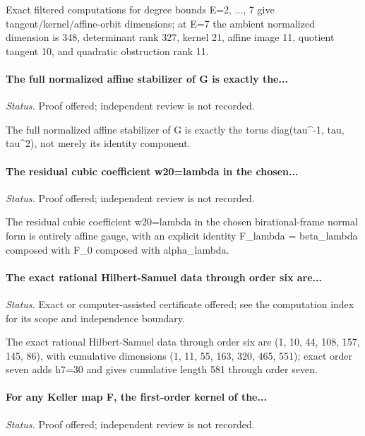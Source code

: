 Exact filtered computations for degree bounds E=2, ..., 7 give tangent/kernel/affine-orbit dimensions; at E=7 the ambient normalized dimension is 348, determinant rank 327, kernel 21, affine image 11, quotient tangent 10, and quadratic obstruction rank 11.

\label{supp-note-03-007}
\paragraph{The full normalized affine stabilizer of G is exactly the...}
\emph{Status.} Proof offered; independent review is not recorded.

The full normalized affine stabilizer of G is exactly the torus diag(tau\textasciicircum{}-1, tau, tau\textasciicircum{}2), not merely its identity component.

\label{supp-note-03-008}
\paragraph{The residual cubic coefficient w20=lambda in the chosen...}
\emph{Status.} Proof offered; independent review is not recorded.

The residual cubic coefficient w20=lambda in the chosen birational-frame normal form is entirely affine gauge, with an explicit identity F\_lambda = beta\_lambda composed with F\_0 composed with alpha\_lambda.

\label{supp-note-03-009}
\paragraph{The exact rational Hilbert-Samuel data through order six are...}
\emph{Status.} Exact or computer-assisted certificate offered; see the computation index for its scope and independence boundary.

The exact rational Hilbert-Samuel data through order six are (1, 10, 44, 108, 157, 145, 86), with cumulative dimensions (1, 11, 55, 163, 320, 465, 551); exact order seven adds h7=30 and gives cumulative length 581 through order seven.

\label{supp-note-03-010}
\paragraph{For any Keller map F, the first-order kernel of the...}
\emph{Status.} Proof offered; independent review is not recorded.

